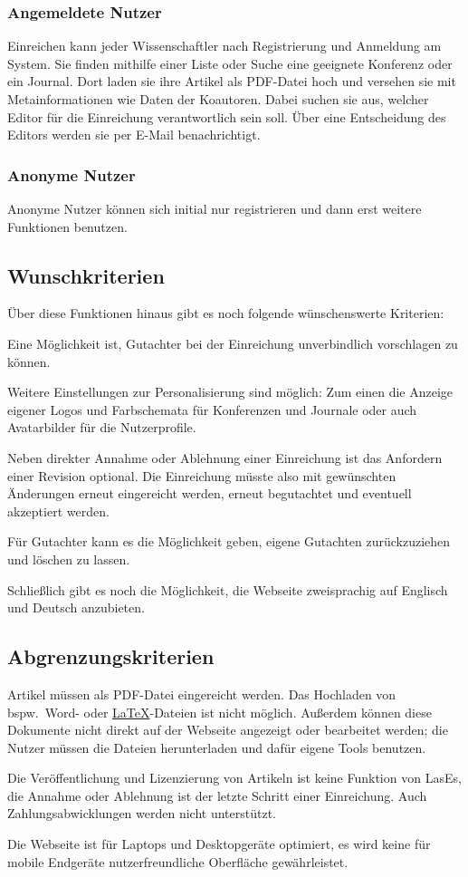 \subsubsection{Angemeldete Nutzer}\label{mkrit:angemeldet}
Einreichen kann jeder Wissenschaftler nach Registrierung und Anmeldung am System.
Sie finden mithilfe einer Liste oder Suche eine geeignete Konferenz oder ein Journal.
Dort laden sie ihre Artikel als PDF-Datei hoch und versehen sie mit Metainformationen wie Daten der Koautoren.
Dabei suchen sie aus, welcher Editor für die Einreichung verantwortlich sein soll.
Über eine Entscheidung des Editors werden sie per E-Mail benachrichtigt.

\subsubsection{Anonyme Nutzer}\label{mkrit:anon}
Anonyme Nutzer können sich initial nur registrieren und dann erst weitere Funktionen benutzen.


\subsection{Wunschkriterien}

Über diese Funktionen hinaus gibt es noch folgende wünschenswerte Kriterien:

Eine Möglichkeit ist, Gutachter bei der Einreichung unverbindlich vorschlagen zu können.

Weitere Einstellungen zur Personalisierung sind möglich:
Zum einen die Anzeige eigener Logos und Farbschemata für Konferenzen und Journale oder auch Avatarbilder für die Nutzerprofile.

Neben direkter Annahme oder Ablehnung einer Einreichung ist das Anfordern einer Revision optional.
Die Einreichung müsste also mit gewünschten Änderungen erneut eingereicht werden, erneut begutachtet und eventuell akzeptiert werden.

Für Gutachter kann es die Möglichkeit geben, eigene Gutachten zurückzuziehen und löschen zu lassen.

Schließlich gibt es noch die Möglichkeit, die Webseite zweisprachig auf Englisch und Deutsch anzubieten.

\subsection{Abgrenzungskriterien}

Artikel müssen als PDF-Datei eingereicht werden. Das Hochladen von bspw.\ Word- oder \hyperref[glo:latex]{\LaTeX}-Dateien ist nicht möglich.
Außerdem können diese Dokumente nicht direkt auf der Webseite angezeigt oder bearbeitet werden;
die Nutzer müssen die Dateien herunterladen und dafür eigene Tools benutzen.

Die Veröffentlichung und Lizenzierung von Artikeln ist keine Funktion von LasEs,
die Annahme oder Ablehnung ist der letzte Schritt einer Einreichung.
Auch Zahlungsabwicklungen werden nicht unterstützt.

Die Webseite ist für Laptops und Desktopgeräte optimiert, es wird keine für mobile Endgeräte nutzerfreundliche Oberfläche gewährleistet.

